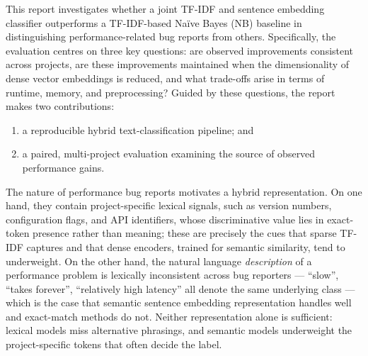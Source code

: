 \documentclass[10pt,a4paper]{article}
\begin{document}
This report investigates whether a joint TF-IDF and sentence embedding classifier outperforms a TF-IDF-based Naïve Bayes (NB) baseline in distinguishing performance-related bug reports from others. Specifically, the evaluation centres on three key questions: are observed improvements consistent across projects, are these improvements maintained when the dimensionality of dense vector embeddings is reduced, and what trade-offs arise in terms of runtime, memory, and preprocessing? Guided by these questions, the report makes two contributions:
\begin{enumerate}[label=(\arabic*)]
    \item a reproducible hybrid text-classification pipeline; and
    \item a paired, multi-project evaluation examining the source of observed performance gains.
\end{enumerate}
The nature of performance bug reports motivates a hybrid representation. On one hand, they contain project-specific lexical signals, such as version numbers, configuration flags, and API identifiers, whose discriminative value lies in exact-token presence rather than meaning; these are precisely the cues that sparse TF-IDF captures and that dense encoders, trained for semantic similarity, tend to underweight. On the other hand, the natural language \textit{description} of a performance problem is lexically inconsistent across bug reporters --- ``slow'', ``takes forever'', ``relatively high latency'' all denote the same underlying class --- which is the case that semantic sentence embedding representation handles well and exact-match methods do not. Neither representation alone is sufficient: lexical models miss alternative phrasings, and semantic models underweight the project-specific tokens that often decide the label.
\end{document}
